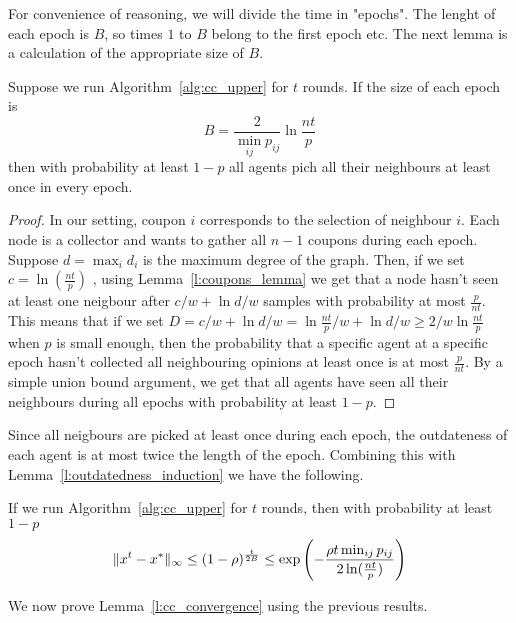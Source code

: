 For convenience of reasoning, we will divide the time in "epochs". 
The lenght of each epoch is $B$, so times $1$ to $B$ belong to the first 
epoch etc. 
The next lemma is a calculation of the appropriate size of $B$.
\begin{lemma}
Suppose we run Algorithm~\ref{alg:cc_upper} for $t$ rounds. If the size of
each epoch is 
\[
B = \frac{2}{\min_{ij}p_{ij}}\ln \frac{nt}{p}
\]
then with probability at least $1-p$ all agents pich all their neighbours 
at least once in every epoch. 
\end{lemma}
\begin{proof}
In our setting, coupon $i$ corresponds to the selection of neighbour $i$. Each node is a 
collector and wants to gather all $n-1$ coupons during each epoch. 
Suppose $d = \max_i d_i$ is the maximum degree of the graph. 
Then, if we set  $c = \ln (\frac{nt}{p})$ , using Lemma~\ref{l:coupons_lemma} 
we get that a node hasn't seen at least one neigbour after $c/w + \ln d/w$ samples 
with probability at most $\frac{p}{nt}$. This means that if we set 
$D = c/w + \ln d/w =  \ln \frac{nt}{p}/w +  \ln d/w \geq 2/w\ln\frac{nt}{p} $ when $p$ is 
small enough, then the probability that a specific agent at a specific epoch hasn't collected 
all neighbouring opinions at least once is at most $\frac{p}{nt}$. By a simple union bound argument, 
we get that all agents have seen all their neighbours during all epochs
 with probability at least $1 - p$.
\end{proof}
Since all neigbours are picked at least once during each epoch,
the outdateness of each agent is at most twice the length of the 
epoch. Combining this with Lemma~\ref{l:outdatedness_induction} we have 
the following.
\begin{corollary}\label{cor:window}
If we run Algorithm~\ref{alg:cc_upper} for $t$ rounds, then with probability at least 
$1-p$
$$ \| x^{t}-x^* \|_{\infty} \leq (1-\rho)^{\frac{t}{2B}} 
\leq \exp \left(-\frac{\rho t\min_{ij}p_{ij}}{2\ln( \frac{nt}{p})} \right)$$
\end{corollary}
We now prove Lemma~\ref{l:cc_convergence} using the previous results.
